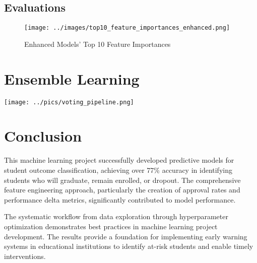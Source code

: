 \documentclass[twoside,final]{hcmut-report}
\begin{document}
\subsection{Evaluations}
\begin{figure}[H]
  \centering
  \texttt{[image: ../images/top10\_feature\_importances\_enhanced.png]}
  \caption{Enhanced Models' Top 10 Feature Importances}
  \label{top10_enhanced}
\end{figure}
\newpage\section{Ensemble Learning}
\begin{minipage}{0.4\textwidth}
  \centering
  \texttt{[image: ../pics/voting\_pipeline.png]}
  \label{pipe_vote}
\end{minipage}
\newpage\section{Conclusion}

This machine learning project successfully developed predictive models for student outcome classification, achieving over 77\% accuracy in identifying students who will graduate, remain enrolled, or dropout. The comprehensive feature engineering approach, particularly the creation of approval rates and performance delta metrics, significantly contributed to model performance.

The systematic workflow from data exploration through hyperparameter optimization demonstrates best practices in machine learning project development. The results provide a foundation for implementing early warning systems in educational institutions to identify at-risk students and enable timely interventions.


\end{document}
